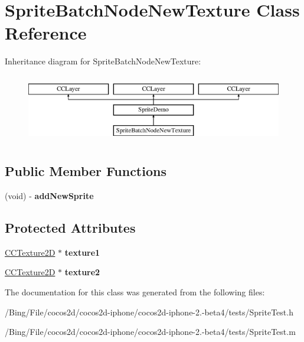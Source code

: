 \hypertarget{interface_sprite_batch_node_new_texture}{\section{Sprite\-Batch\-Node\-New\-Texture Class Reference}
\label{interface_sprite_batch_node_new_texture}
}
Inheritance diagram for Sprite\-Batch\-Node\-New\-Texture\-:\begin{figure}[H]
\begin{center}
\leavevmode
\includegraphics[height=3.000000cm]{interface_sprite_batch_node_new_texture}
\end{center}
\end{figure}
\subsection*{Public Member Functions}
\begin{DoxyCompactItemize}
\item 
\hypertarget{interface_sprite_batch_node_new_texture_a7fdd52f7fccb1e0737afc601fec387da}{(void) -\/ {\bfseries add\-New\-Sprite}}\label{interface_sprite_batch_node_new_texture_a7fdd52f7fccb1e0737afc601fec387da}

\end{DoxyCompactItemize}
\subsection*{Protected Attributes}
\begin{DoxyCompactItemize}
\item 
\hypertarget{interface_sprite_batch_node_new_texture_a212dfd4fb250c0146818c12dddac2594}{\hyperlink{class_c_c_texture2_d}{C\-C\-Texture2\-D} $\ast$ {\bfseries texture1}}\label{interface_sprite_batch_node_new_texture_a212dfd4fb250c0146818c12dddac2594}

\item 
\hypertarget{interface_sprite_batch_node_new_texture_a981b58d218f4ea218ae14a1dd7f36b10}{\hyperlink{class_c_c_texture2_d}{C\-C\-Texture2\-D} $\ast$ {\bfseries texture2}}\label{interface_sprite_batch_node_new_texture_a981b58d218f4ea218ae14a1dd7f36b10}

\end{DoxyCompactItemize}


The documentation for this class was generated from the following files\-:\begin{DoxyCompactItemize}
\item 
/\-Bing/\-File/cocos2d/cocos2d-\/iphone/cocos2d-\/iphone-\/2.-\/beta4/tests/Sprite\-Test.\-h\item 
/\-Bing/\-File/cocos2d/cocos2d-\/iphone/cocos2d-\/iphone-\/2.-\/beta4/tests/Sprite\-Test.\-m\end{DoxyCompactItemize}
